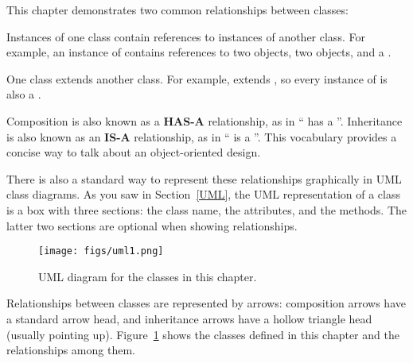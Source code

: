 
This chapter demonstrates two common relationships between classes:

\begin{description}

Instances of one class contain references to instances of another class.
For example, an instance of  contains references to two  objects, two  objects, and a .

One class extends another class.
For example,  extends , so every instance of  is also a .

\end{description}


Composition is also known as a {\bf HAS-A} relationship, as in `` has a ''.
Inheritance is also known as an {\bf IS-A} relationship, as in `` is a ''.
This vocabulary provides a concise way to talk about an object-oriented design.


There is also a standard way to represent these relationships graphically in UML class diagrams.
As you saw in Section~\ref{UML}, the UML representation of a class is a box with three sections: the class name, the attributes, and the methods.
The latter two sections are optional when showing relationships.


\begin{figure}[!ht]
\begin{center}
\texttt{[image: figs/uml1.png]}
\caption{UML diagram for the classes in this chapter.}
\label{fig.uml1}
\end{center}
\end{figure}

Relationships between classes are represented by arrows: composition arrows have a standard arrow head, and inheritance arrows have a hollow triangle head (usually pointing up).
Figure~\ref{fig.uml1} shows the classes defined in this chapter and the relationships among them.

